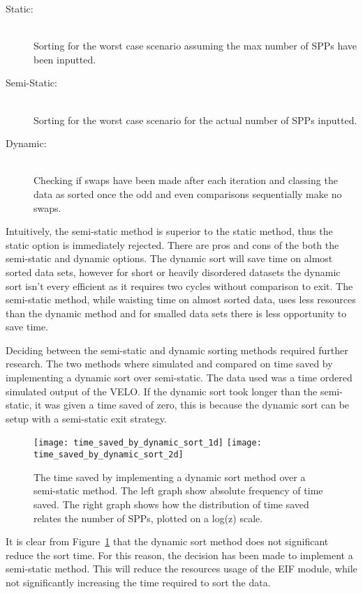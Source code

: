 			\begin{description}
				\item [Static:] \hfill \\ Sorting for the worst case scenario assuming the max number of SPPs have been inputted.
				\item [Semi-Static:] \hfill \\ Sorting for the worst case scenario for the actual number of SPPs inputted.
				\item [Dynamic:] \hfill \\ Checking if swaps have been made after each iteration and classing the data as sorted once the odd and even comparisons sequentially make no swaps.
			\end{description}			

			Intuitively, the semi-static method is superior to the static method, thus the static option is immediately rejected.
			There are pros and cons of the both the semi-static and dynamic options. 
			The dynamic sort will save time on almost sorted data sets, however for short or heavily disordered datasets the dynamic sort isn't every efficient as it requires two cycles without comparison to exit.
			The semi-static method, while waisting time on almost sorted data, uses less resources than the dynamic method and for smalled data sets there is less opportunity to save time.

			Deciding between the semi-static and dynamic sorting methods required further research.
			The two methods where simulated and compared on time saved by implementing a dynamic sort over semi-static.
			The data used was a time ordered simulated output of the VELO.
			If the dynamic sort took longer than the semi-static, it was given a time saved of zero, this is because the dynamic sort can be setup with a semi-static exit strategy.

			\begin{figure}[ht]
				\centering
				\texttt{[image: time\_saved\_by\_dynamic\_sort\_1d]}
				\texttt{[image: time\_saved\_by\_dynamic\_sort\_2d]}
				\caption{The time saved by implementing a dynamic sort method over a semi-static method. The left graph show absolute frequency of time saved. The right graph shows how the distribution of time saved relates the number of SPPs, plotted on a log(z) scale.}
				\label{fig:dyn_stat_comp}
			\end{figure}			

			It is clear from Figure~\ref{fig:dyn_stat_comp} that the dynamic sort method does not significant reduce the sort time.
			For this reason, the decision has been made to implement a semi-static method.
			This will reduce the resources usage of the EIF module, while not significantly increasing the time required to sort the data.

